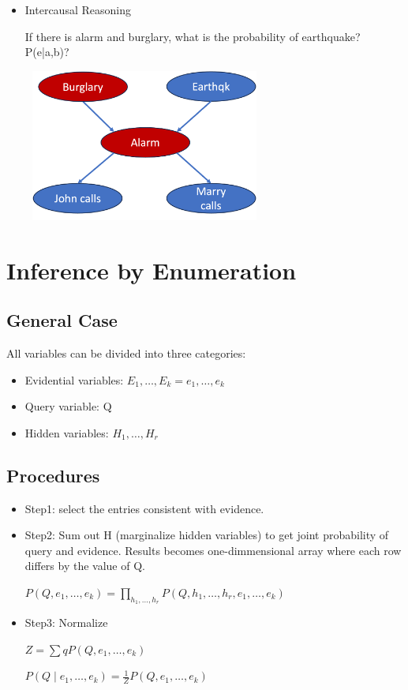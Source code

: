 \documentclass[11pt,a4paper]{report}
\begin{document}
\begin{itemize}
        \item Intercausal Reasoning
        
        If there is alarm and burglary, what is the probability of earthquake? P(e|a,b)?

        \includegraphics[width = 8cm, height = 5cm]{intercausal_reasoning2.png}

\end{itemize}


\chapter{Inference by Enumeration}

\section{General Case}

All variables can be divided into three categories:

\begin{itemize}
    \item Evidential variables: $E_{1}, \ldots, E_{k} = e_{1}, \ldots, e_{k}$
    \item Query variable: Q
    \item Hidden variables: $H_{1}, \dots, H_{r}$
\end{itemize}

\section{Procedures}

\begin{itemize}
    \item Step1: select the entries consistent with evidence.
    \item Step2: Sum out H (marginalize hidden variables) to get joint probability of query and evidence. Results becomes one-dimmensional array where each row differs by the value of Q.
    \begin{center}
        $P(Q, e_{1}, \ldots, e_{k}) = \prod_{h_{1}, \ldots, h_{r}}P(Q, h_{1}, \ldots, h_{r}, e_{1}, \ldots, e_{k})$
    \end{center}
    \item Step3: Normalize
    \begin{center}
        $Z = \sum{q} P(Q, e_{1}, \ldots, e_{k})$

        $P(Q \mid e_{1}, \ldots, e_{k}) = \frac{1}{Z}P(Q, e_{1}, \ldots, e_{k})$
    \end{center}
\end{itemize}
\end{document}
